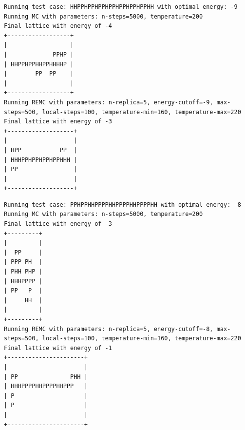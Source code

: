 \begin{appendices}
\begin{verbatim}
Running test case: HHPPHPPHPPHPPHPPHPPHPPHH with optimal energy: -9
Running MC with parameters: n-steps=5000, temperature=200
Final lattice with energy of -4
+------------------+
|                  |
|             PPHP |
| HHPPHPPHHPPHHHHP |
|        PP  PP    |
|                  |
+------------------+
Running REMC with parameters: n-replica=5, energy-cutoff=-9, max-steps=500, local-steps=100, temperature-min=160, temperature-max=220
Final lattice with energy of -3
+-------------------+
|                   |
| HPP           PP  |
| HHHPPHPPHPPHPPHHH |
| PP                |
|                   |
+-------------------+
\end{verbatim}

\begin{verbatim}
Running test case: PPHPPHHPPPPHHPPPPHHPPPPHH with optimal energy: -8
Running MC with parameters: n-steps=5000, temperature=200
Final lattice with energy of -3
+---------+
|         |
|  PP     |
| PPP PH  |
| PHH PHP |
| HHHPPPP |
| PP   P  |
|     HH  |
|         |
+---------+
Running REMC with parameters: n-replica=5, energy-cutoff=-8, max-steps=500, local-steps=100, temperature-min=160, temperature-max=220
Final lattice with energy of -1
+----------------------+
|                      |
| PP               PHH |
| HHHPPPPHHPPPPHHPPP   |
| P                    |
| P                    |
|                      |
+----------------------+
\end{verbatim}

\end{appendices}